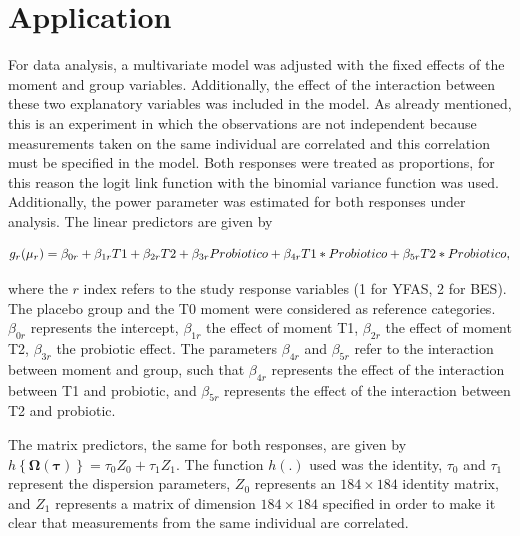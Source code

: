 \documentclass[AMA,STIX1COL]{WileyNJD-v2}
\begin{document}

\section{Application}\label{sec6}


For data analysis, a multivariate model was adjusted with the fixed effects of the moment and group variables. Additionally, the effect of the interaction between these two explanatory variables was included in the model. As already mentioned, this is an experiment in which the observations are not independent because measurements taken on the same individual are correlated and this correlation must be specified in the model. Both responses were treated as proportions, for this reason the logit link function with the binomial variance function was used. Additionally, the power parameter was estimated for both responses under analysis. The linear predictors are given by

$$
g_{r}(\mu_{r}) = \beta_{0r} + \beta_{1r} T1 + \beta_{2r} T2 + \beta_{3r} Probiotico + \\ \beta_{4r} T1*Probiotico + \beta_{5r} T2*Probiotico,
$$

\noindent where the $r$ index refers to the study response variables (1 for YFAS, 2 for BES). The placebo group and the T0 moment were considered as reference categories. $\beta_{0r}$ represents the intercept, $\beta_{1r}$ the effect of moment T1, $\beta_{2r}$ the effect of moment T2, $\beta_{3r}$ the probiotic effect. The parameters $\beta_{4r}$ and $\beta_{5r}$ refer to the interaction between moment and group, such that $\beta_{4r}$ represents the effect of the interaction between T1 and probiotic, and $ \beta_{5r}$ represents the effect of the interaction between T2 and probiotic.

The matrix predictors, the same for both responses, are given by $h\left \{ \boldsymbol{\Omega}(\boldsymbol{\tau}) \right \} = \tau_0Z_0 + \tau_1Z_1$. The function $h(.)$ used was the identity, $\tau_0$ and $\tau_1$ represent the dispersion parameters, $Z_0$ represents an $184 \times 184$ identity matrix, and $Z_1$ represents a matrix of dimension $184 \times 184$ specified in order to make it clear that measurements from the same individual are correlated. 
\end{document}

